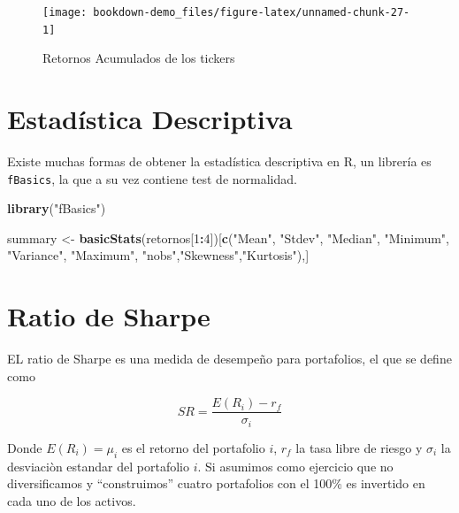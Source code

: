 \documentclass[12pt,]{book}
\newenvironment{Shaded}{\begin{snugshade}}{\end{snugshade}}
\newcommand{\KeywordTok}[1]{\textcolor[rgb]{0.13,0.29,0.53}{\textbf{#1}}}
\newcommand{\DecValTok}[1]{\textcolor[rgb]{0.00,0.00,0.81}{#1}}
\newcommand{\StringTok}[1]{\textcolor[rgb]{0.31,0.60,0.02}{#1}}
\newcommand{\OperatorTok}[1]{\textcolor[rgb]{0.81,0.36,0.00}{\textbf{#1}}}
\newcommand{\NormalTok}[1]{#1}
\begin{document}
\begin{figure}

{\centering \texttt{[image: bookdown-demo\_files/figure-latex/unnamed-chunk-27-1]} 

}

\caption{Retornos Acumulados de los tickers}\label{fig:unnamed-chunk-27}
\end{figure}

\section{Estadística Descriptiva}\label{estadistica-descriptiva}

Existe muchas formas de obtener la estadística descriptiva en R, un
librería es \texttt{fBasics}, la que a su vez contiene test de
normalidad.

\begin{Shaded}
\begin{Highlighting}[]
\KeywordTok{library}\NormalTok{(}\StringTok{"fBasics"}\NormalTok{)}
\end{Highlighting}
\end{Shaded}

\begin{Shaded}
\begin{Highlighting}[]
\NormalTok{summary <-}\StringTok{ }\KeywordTok{basicStats}\NormalTok{(retornos[}\DecValTok{1}\OperatorTok{:}\DecValTok{4}\NormalTok{])[}\KeywordTok{c}\NormalTok{(}\StringTok{"Mean"}\NormalTok{, }\StringTok{"Stdev"}\NormalTok{, }\StringTok{"Median"}\NormalTok{, }\StringTok{"Minimum"}\NormalTok{, }\StringTok{"Variance"}\NormalTok{,}
                                       \StringTok{"Maximum"}\NormalTok{, }\StringTok{"nobs"}\NormalTok{,}\StringTok{"Skewness"}\NormalTok{,}\StringTok{"Kurtosis"}\NormalTok{),]}
\end{Highlighting}
\end{Shaded}

\section{Ratio de Sharpe}\label{ratio-de-sharpe}

EL ratio de Sharpe es una medida de desempeño para portafolios, el que
se define como

\[
SR = \frac{E(R_i) - r_f}{\sigma_i}
\]

Donde \(E(R_i) = \mu_i\) es el retorno del portafolio \(i\), \(r_f\) la
tasa libre de riesgo y \(\sigma_i\) la desviaciòn estandar del
portafolio \(i\). Si asumimos como ejercicio que no diversificamos y
``construimos'' cuatro portafolios con el 100\% es invertido en cada uno
de los activos.
\end{document}
